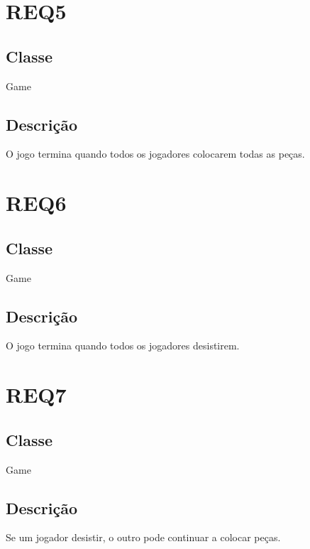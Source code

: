 \section{REQ5}
\subsection{Classe}
Game
\subsection{Descrição}
O jogo termina quando todos os jogadores colocarem todas as peças.

\section{REQ6}
\subsection{Classe}
Game
\subsection{Descrição}
O jogo termina quando todos os jogadores desistirem.

\section{REQ7}
\subsection{Classe}
Game
\subsection{Descrição}
Se um jogador desistir, o outro pode continuar a colocar peças.

